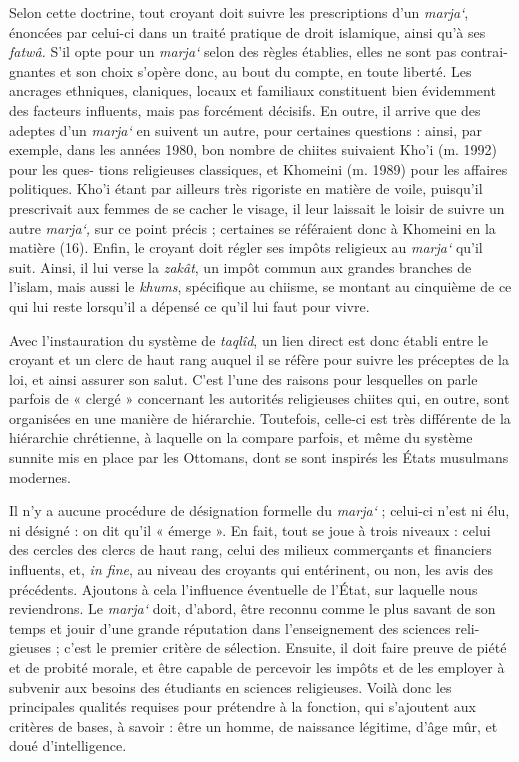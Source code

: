 Selon cette doctrine, tout croyant doit suivre les prescriptions d'un
\emph{marja`}, énoncées par celui-ci dans un traité pratique de droit
islamique, ainsi qu'à ses \emph{fatwâ.} S'il opte pour un \emph{marja`}
selon des règles établies, elles ne sont pas contrai- gnantes et son
choix s'opère donc, au bout du compte, en toute liberté. Les ancrages
ethniques, claniques, locaux et familiaux constituent bien évidemment
des facteurs influents, mais pas forcément décisifs. En outre, il arrive
que des adeptes d'un \emph{marja`} en suivent un autre, pour certaines
questions : ainsi, par exemple, dans les années 1980, bon nombre de
chiites suivaient Kho'i (m. 1992) pour les ques- tions religieuses
classiques, et Khomeini (m. 1989) pour les affaires politiques. Kho'i
étant par ailleurs très rigoriste en matière de voile, puisqu'il
prescrivait aux femmes de se cacher le visage, il leur laissait le
loisir de suivre un autre \emph{marja`,} sur ce point précis ; certaines
se référaient donc à Khomeini en la matière (16). Enfin, le croyant doit
régler ses impôts religieux au \emph{marja`} qu'il suit. Ainsi, il lui
verse la \emph{zakât}, un impôt commun aux grandes branches de l'islam,
mais aussi le \emph{khums}, spécifique au chiisme, se montant au
cinquième de ce qui lui reste lorsqu'il a dépensé ce qu'il lui faut pour
vivre.

Avec l'instauration du système de \emph{taqlîd}, un lien direct est donc
établi entre le croyant et un clerc de haut rang auquel il se réfère
pour suivre les préceptes de la loi, et ainsi assurer son salut. C'est
l'une des raisons pour lesquelles on parle parfois de « clergé »
concernant les autorités religieuses chiites qui, en outre, sont
organisées en une manière de hiérarchie. Toutefois, celle-ci est très
différente de la hiérarchie chrétienne, à laquelle on la compare
parfois, et même du système sunnite mis en place par les Ottomans, dont
se sont inspirés les États musulmans modernes.

Il n'y a aucune procédure de désignation formelle du \emph{marja`} ;
celui-ci n'est ni élu, ni désigné : on dit qu'il « émerge ». En fait,
tout se joue à trois niveaux : celui des cercles des clercs de haut
rang, celui des milieux commerçants et financiers influents, et,
\emph{in fine}, au niveau des croyants qui entérinent, ou non, les avis
des précédents. Ajoutons à cela l'influence éventuelle de l'État, sur
laquelle nous reviendrons. Le \emph{marja`} doit, d'abord, être reconnu
comme le plus savant de son temps et jouir d'une grande réputation dans
l'enseignement des sciences reli- gieuses ; c'est le premier critère de
sélection. Ensuite, il doit faire preuve de piété et de probité morale,
et être capable de percevoir les impôts et de les employer à subvenir
aux besoins des étudiants en sciences religieuses. Voilà donc les
principales qualités requises pour prétendre à la fonction, qui
s'ajoutent aux critères de bases, à savoir : être un homme, de naissance
légitime, d'âge mûr, et doué d'intelligence.

